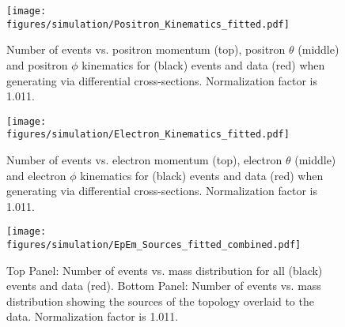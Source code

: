 %
%
\begin{figure}[h!]\begin{center}
\texttt{[image: \\figures/simulation/Positron\_Kinematics\_fitted.pdf]}
\caption[Number of events vs. positron momentum (top), positron $\theta$ (middle) and positron $\phi$ kinematics for  (black) events and data (red) when generating  via differential cross-sections]{\label{fig:simsmear.Ep}Number of events vs. positron momentum (top), positron $\theta$ (middle) and positron $\phi$ kinematics for  (black) events and data (red) when generating  via differential cross-sections. Normalization factor is 1.011.}
\end{center}\end{figure} 
%
%
\begin{figure}[h!]\begin{center}
\texttt{[image: \\figures/simulation/Electron\_Kinematics\_fitted.pdf]}
\caption[Number of events vs. electron momentum (top), electron $\theta$ (middle) and electron $\phi$ kinematics for  (black) events and data (red) when generating  via differential cross-sections]{\label{fig:simsmear.Em}Number of events vs. electron momentum (top), electron $\theta$ (middle) and electron $\phi$ kinematics for  (black) events and data (red) when generating  via differential cross-sections. Normalization factor is 1.011. }
\end{center}\end{figure} 
%
%
\begin{figure}[h!]\begin{center}
\texttt{[image: \\figures/simulation/EpEm\_Sources\_fitted\_combined.pdf]}
\caption[Number of events vs. \epem mass distribution for all  (black) events and data (red)]{\label{fig:simsmear.EpEm}Top Panel: Number of events vs. \epem mass distribution for all  (black) events and data (red). Bottom Panel: Number of events vs. \epem mass distribution showing the sources of the  \epem topology overlaid to the data. Normalization factor is 1.011.}
\end{center}\end{figure} 

\FloatBarrier
